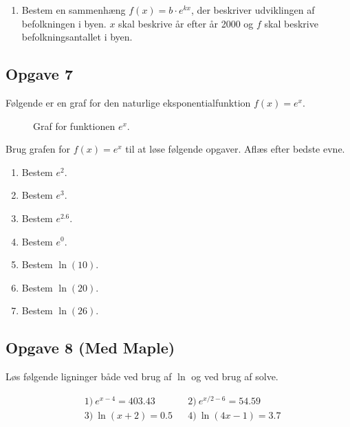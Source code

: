 \begin{enumerate}[label=\roman*)]
	\item Bestem en sammenhæng $f(x) = b \cdot e^{kx}$, der beskriver udviklingen af befolkningen i byen. $x$ 
	skal beskrive år efter år 2000 og $f$ skal beskrive befolkningsantallet i byen. 
\end{enumerate}

\subsection*{Opgave 7}

Følgende er en graf for den naturlige eksponentialfunktion $f(x) = e^x$. 

\begin{figure}[H]
	\centering
	\caption{Graf for funktionen $e^x$.}
\end{figure}

Brug grafen for $f(x) = e^x$ til at løse følgende opgaver. Aflæs efter bedste evne. 
\begin{enumerate}[label=\roman*)]
	\item Bestem $e^2$.
	\item Bestem $e^3$.
	\item Bestem $e^{2.6}$.
	\item Bestem $e^0$.
	\item Bestem $\ln(10)$.
	\item Bestem $\ln(20)$.
	\item Bestem $\ln(26)$.
\end{enumerate}


\subsection*{Opgave 8 (Med Maple)}
Løs følgende ligninger både ved brug af $\ln$ og ved brug af solve.

\begin{align*}
	&1)\ e^{x-4} = 403.43 &   &2) \  e^{x/2 - 6} = 54.59\\
	&3)\ \ln(x + 2) = 0.5 &   &4) \ \ln(4x -1) = 3.7  \\
\end{align*}

